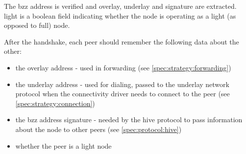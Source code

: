 The bzz address is verified and overlay, underlay and signature are extracted.
light is a boolean field indicating whether the node is operating as a light (as opposed to full) node.

After the handshake,  each peer should remember the following data about the other:

\begin{itemize}
    \item the overlay address - used in forwarding  (see  \ref{spec:strategy:forwarding})
    \item the underlay address - used for dialing, passed to the underlay network protocol when the connectivity driver needs to connect to the peer (see \ref{spec:strategy:connection})
    \item the bzz address signature - needed by the hive protocol to pass information about the node to other peers (see \ref{spec:protocol:hive})
    \item whether the peer is a light node
\end{itemize}

